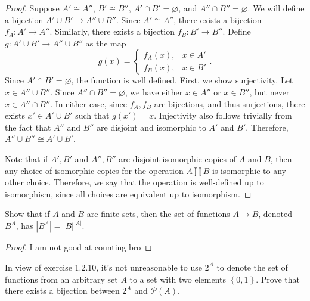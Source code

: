 \documentclass[11pt]{report}
\begin{document}
\begin{proof}
	Suppose $A'\cong A''$, $B'\cong B''$, $A'\cap B'=\varnothing$, and $A''\cap B''=\varnothing$. We will define a bijection $A'\cup B'\to A''\cup B''$. Since $A'\cong A''$, there exists a bijection $f_A : A' \to A''$. Similarly, there exists a bijection $f_B : B' \to B''$. Define $g : A'\cup B' \to A''\cup B''$ as the map
	\[
		g(x)=
		\begin{cases}
			f_A(x),&x\in A'\\
			f_B(x),&x\in B'
		\end{cases}
	.\]
	Since $A'\cap B'=\varnothing$, the function is well defined. First, we show surjectivity. Let $x\in A''\cup B''$. Since $A''\cap B''=\varnothing$, we have either $x\in A''$ or $x\in B''$, but never $x\in A''\cap B''$. In either case, since $f_A,f_B$ are bijections, and thus surjections, there exists $x'\in A'\cup B'$ such that $g(x')=x$. Injectivity also follows trivially from the fact that $A''$ and $B''$ are disjoint and isomorphic to $A'$ and $B'$. Therefore, $A''\cup B''\cong A'\cup B'$.

	Note that if $A',B'$ and $A'',B''$ are disjoint isomorphic copies of $A$ and $B$, then any choice of isomorphic copies for the operation $A\amalg B$ is isomorphic to any other choice. Therefore, we say that the operation is well-defined up to isomorphism, since all choices are equivalent up to isomorphism.
\end{proof}
\begin{exercise}
	Show that if $A$ and $B$ are finite sets, then the set of functions $A\to B$, denoted $B^A$, has $\left| B^A \right| =\left| B \right| ^{\left| A \right| }$.
\end{exercise}
\begin{proof}
	I am not good at counting bro
\end{proof}
\begin{exercise}
	In view of exercise 1.2.10, it's not unreasonable to use $2^A$ to denote the set of functions from an arbitrary set $A$ to a set with two elements $\left\{ 0,1 \right\} $. Prove that there exists a bijection between $2^A$ and $\mathscr{P} (A)$.
\end{exercise}
\end{document}
